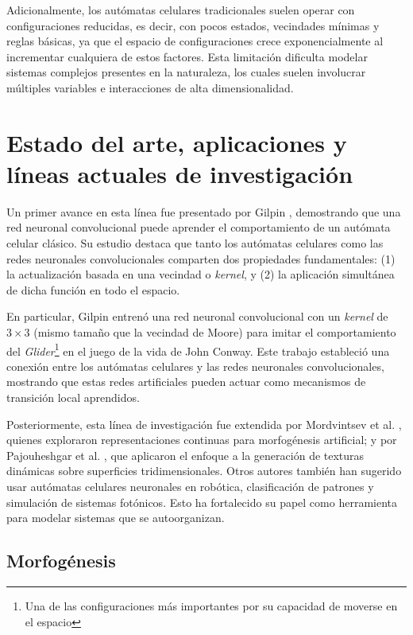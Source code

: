 Adicionalmente, los autómatas celulares tradicionales suelen operar con configuraciones reducidas, es decir, con pocos estados, vecindades mínimas y reglas básicas, ya que el espacio de configuraciones crece exponencialmente al incrementar cualquiera de estos factores. Esta limitación dificulta modelar sistemas complejos presentes en la naturaleza, los cuales suelen involucrar múltiples variables e interacciones de alta dimensionalidad.

\section{Estado del arte, aplicaciones y líneas actuales de investigación}

Un primer avance en esta línea fue presentado por Gilpin \cite{gilpin2019_nca}, demostrando que una red neuronal convolucional puede aprender el comportamiento de un autómata celular clásico. Su estudio destaca que tanto los autómatas celulares como las redes neuronales convolucionales comparten dos propiedades fundamentales: (1) la actualización basada en una vecindad o \textit{kernel}, y (2) la aplicación simultánea de dicha función en todo el espacio.

En particular, Gilpin entrenó una red neuronal convolucional con un \textit{kernel} de $3 \times 3$ (mismo tamaño que la vecindad de Moore) para imitar el comportamiento del \textit{Glider}\footnote{Una de las configuraciones más importantes por su capacidad de moverse en el espacio} en el juego de la vida de John Conway. Este trabajo estableció una conexión entre los autómatas celulares y las redes neuronales convolucionales, mostrando que estas redes artificiales pueden actuar como mecanismos de transición local aprendidos.

Posteriormente, esta línea de investigación fue extendida por Mordvintsev et al. \cite{mordvintsev2020_nca}, quienes exploraron representaciones continuas para morfogénesis artificial; y por Pajouheshgar et al. \cite{mordvintsev2024_mesh_nca}, que aplicaron el enfoque a la generación de texturas dinámicas sobre superficies tridimensionales. Otros autores también han sugerido usar autómatas celulares neuronales en robótica, clasificación de patrones y simulación de sistemas fotónicos. Esto ha fortalecido su papel como herramienta para modelar sistemas que se autoorganizan.

\subsection{Morfogénesis}


